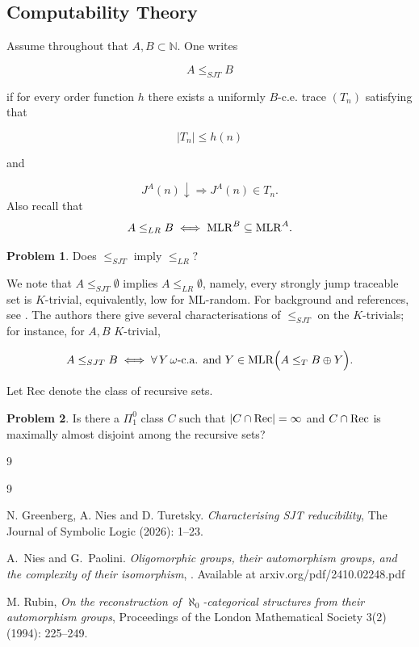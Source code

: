 \documentclass[11pt]{amsart}
\theoremstyle{definition}
\newtheorem{problem}{Problem}[section]
\begin{document}
\subsection*{Computability Theory}


Assume throughout that $A,B\subset\mathbb{N}$. One writes 

\[
A \le_{SJT} B
\]

if for every   order function $h$ there exists a uniformly
$B$-c.e. trace $(T_n)$ satisfying that

\[
|T_n|\le h(n)
\]

and

\[
J^A(n)\downarrow
\Longrightarrow
J^A(n)\in T_n.
\]
Also recall that 
\[
A\le_{LR} B
\iff
{\rm MLR}^B\subseteq{\rm MLR}^A.
\]

\begin{problem}
	Does $\le_{SJT}$ imply $\le_{LR}$?
\end{problem}



 We note that  $A\le_{SJT}\emptyset$ implies $A \le_{LR}\emptyset$, namely, every strongly jump traceable set is $K$-trivial, equivalently, low for ML-random.  For background and references, see \cite{GNT}. The authors there give several   characterisations of $\le_{SJT}$ on the $K$-trivials; for instance,  for $A,B$ $K$-trivial,

\[
A\le_{SJT} B
\iff
\forall\,Y\, \omega\text{-c.a. and }Y\in{\rm MLR}
\Bigl(
A\le_T B\oplus Y
\Bigr).
\]


Let Rec denote the class of recursive sets. 


\begin{problem}
    Is there a $\Pi^0_1$ class $C$ such that $|C\cap {\rm Rec}|=\infty$ and $C\cap {\rm Rec}$ is maximally almost disjoint among the recursive sets?
\end{problem}

 
\vskip -12pt

\begin{bibentry}{9}
\begin{thebibliography}{9}

 N. Greenberg, A. Nies and D. Turetsky.  \textit{Characterising SJT reducibility}, The Journal of Symbolic Logic (2026): 1--23.

A.~Nies and G.~Paolini.
\textit{Oligomorphic groups,  their automorphism groups,   and  the  complexity of their isomorphism}, 
.
 Available at {arxiv.org/pdf/2410.02248.pdf}

 M. Rubin, \textit{On the reconstruction of $\aleph_0$-categorical structures from their automorphism groups},  Proceedings of the London Mathematical Society 3(2) (1994): 225--249.
\end{thebibliography}
\end{bibentry}
\end{document}
